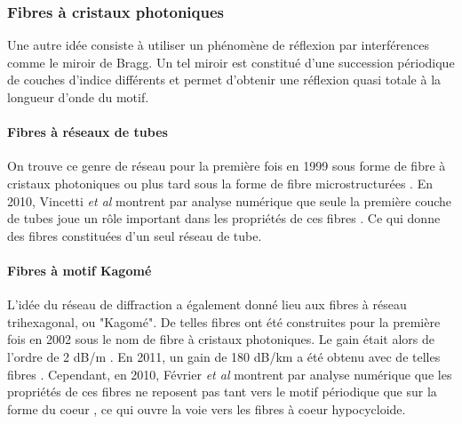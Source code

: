 \subsubsection{Fibres à cristaux photoniques}

Une autre idée consiste à utiliser un phénomène de réflexion par interférences comme le miroir de Bragg. Un tel miroir est constitué d'une succession périodique de couches d'indice différents et permet d'obtenir une réflexion quasi totale à la longueur d'onde du motif. 

\paragraph{Fibres à réseaux de tubes}
On trouve ce genre de réseau pour la première fois en 1999 sous forme de fibre à cristaux photoniques \cite{cregan_single-mode_1999} ou plus tard sous la forme de fibre microstructurées \cite{argyros_hollow-core_2006}. En 2010, Vincetti \emph{et al} montrent par analyse numérique que seule la première couche de tubes joue un rôle important dans les propriétés de ces fibres \cite{vincetti_waveguiding_2010}. Ce qui donne des fibres constituées d'un seul réseau de tube.

\paragraph{Fibres à motif Kagomé}
L'idée du réseau de diffraction a également donné lieu aux fibres à réseau trihexagonal, ou "Kagomé". De telles fibres ont été construites pour la première fois en 2002 sous le nom de fibre à cristaux photoniques. Le gain était alors de l'ordre de 2 dB/m \cite{benabid_stimulated_2002}. En 2011, un gain de 180 dB/km a été obtenu avec de telles fibres \cite{wang_low_2011}.
Cependant, en 2010, Février \emph{et al} montrent par analyse numérique que les propriétés de ces fibres ne reposent pas tant vers le motif périodique que sur la forme du coeur \cite{fevrier_understanding_2010}, ce qui ouvre la voie vers les fibres à coeur hypocycloide. 


